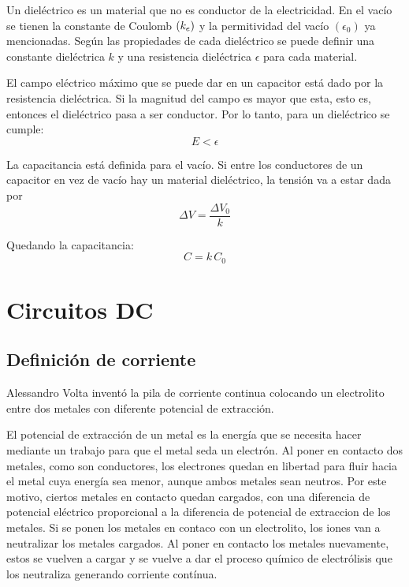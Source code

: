 \documentclass[a5paper,12pt,twoside]{book}
\begin{document}
Un dieléctrico es un material que no es conductor de la electricidad. En el vacío se tienen la constante de Coulomb $(k_e)$ y la permitividad del vacío $(\epsilon_0)$ ya mencionadas. Según las propiedades de cada dieléctrico se puede definir una constante dieléctrica $k$ y una resistencia dieléctrica $\epsilon$ para cada material.

El campo eléctrico máximo que se puede dar en un capacitor está dado por la resistencia dieléctrica. Si la magnitud del campo es mayor que esta, esto es, entonces el dieléctrico pasa a ser conductor. Por lo tanto, para un dieléctrico se cumple:
\begin{equation*}
    E < \epsilon
\end{equation*}

La capacitancia está definida para el vacío. Si entre los conductores de un capacitor en vez de vacío hay un material dieléctrico, la tensión va a estar dada por
\begin{equation*}
    \Delta V = \frac{\Delta V_0}{k}
\end{equation*}

Quedando la capacitancia:
\begin{equation*}
    C = k \, C_0
\end{equation*}


\chapter{Circuitos DC}


\section{Definición de corriente}

Alessandro Volta inventó la pila de corriente continua colocando un electrolito entre dos metales con diferente potencial de extracción.

El potencial de extracción de un metal es la energía que se necesita hacer mediante un trabajo para que el metal seda un electrón. Al poner en contacto dos metales, como son conductores, los electrones quedan en libertad para fluir hacia el metal cuya energía sea menor, aunque ambos metales sean neutros. Por este motivo, ciertos metales en contacto quedan cargados, con una diferencia de potencial eléctrico proporcional a la diferencia de potencial de extraccion de los metales. Si se ponen los metales en contaco con un electrolito, los iones van a neutralizar los metales cargados. Al poner en contacto los metales nuevamente, estos se vuelven a cargar y se vuelve a dar el proceso químico de electrólisis que los neutraliza generando corriente contínua.
\end{document}

